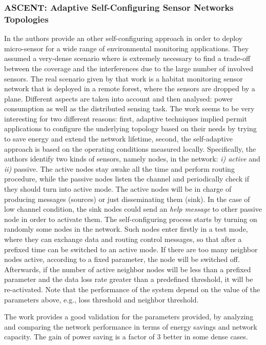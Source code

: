 \subsubsection*{ASCENT: Adaptive Self-Configuring Sensor Networks Topologies}
In \cite{ascent} the authors provide an other self-configuring approach in order
to deploy micro-sensor for a wide range of environmental monitoring
applications. They assumed a very-dense scenario where is extremely necessary to
find a trade-off between the coverage and the interferences due to the
large number of involved sensors. The real scenario given by that work is a
habitat monitoring sensor network that is deployed in a remote forest, where the
sensors are dropped by a plane.  Different aspects are taken into account and
then analysed: power consumption as well as the distributed sensing task. The
work seems to be very interesting for two different reasons: first, adaptive
techniques implied permit applications to configure the underlying topology
based on their needs by trying to save energy and extend the network lifetime,
second, the self-adaptive approach is based on the operating conditions measured
locally.  Specifically, the authors identify two kinds of sensors, namely nodes,
in the network: \textit{i) active} and \textit{ii)} passive. The active nodes
stay awake all the time and perform routing procedure, while the passive nodes
listen the channel and periodically check if they should turn into active mode.
The active nodes will be in charge of producing messages (sources) or just
disseminating them (sink). In the case of low channel condition, the sink nodes
could send an \textit{help message} to other passive node in order to activate
them.  The self-configuring process starts by turning on randomly some nodes in
the network. Such nodes enter firstly in a test mode, where they can exchange
data and routing control messages, so that after a prefixed time can be switched
to an active mode. If there are too many neighbor nodes active, according to a
fixed parameter, the node will be switched off. Afterwards, if the number of
active neighbor nodes will be less than a prefixed parameter and the data loss
rate greater than a predefined threshold, it will be re-activated.
Note that the performance of the system depend on the value of the parameters
above, e.g., loss threshold and neighbor threshold.

The work provides a good validation for the parameters provided, by analyzing and
comparing the network performance in terms of energy savings and network
capacity. The gain of power saving is a factor of $3$ better in some dense
cases.
